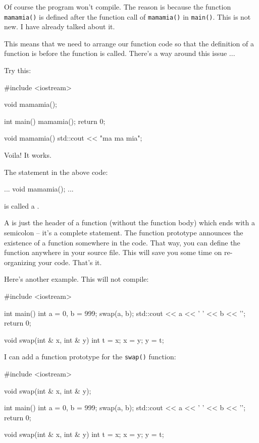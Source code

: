 Of course the program won't compile. The reason is because the function \texttt{mamamia()} is defined after the function call of \texttt{mamamia()} in \texttt{main()}. This is not new. I have already talked about it.

This means that we need to arrange our function code so that the definition of a function is before the function is called. There's a way around this issue ...

Try this:

\begin{consolethree}[escapeinside=||]
#include <iostream>

void mamamia();

int main()
{
    mamamia();
    return 0;
}

void mamamia()
{
    std::cout << "ma ma mia\n";
}
\end{consolethree}

Voila! It works.

The statement in the above code:

\begin{consolethree}[escapeinside=||]
...
void mamamia();
...
\end{consolethree}

is called a .

A  is just the header of a function (without the function body) which ends with a semicolon -- it's a complete statement. The function prototype announces the existence of a function somewhere in the code. That way, you can define the function anywhere in your source file. This will save you some time on re-organizing your code. That's it.

Here's another example. This will not compile:

\begin{consolethree}[escapeinside=||]
#include <iostream>

int main()
{
    int a = 0, b = 999;
    swap(a, b);
    std::cout << a << ' ' << b << '\n';
    return 0;
}

void swap(int & x, int & y)
{
    int t = x;
    x = y;
    y = t;
}
\end{consolethree}

I can add a function prototype for the \texttt{swap()} function:

\begin{consolethree}[escapeinside=||]
#include <iostream>

void swap(int & x, int & y);

int main()
{
    int a = 0, b = 999;
    swap(a, b);
    std::cout << a << ' ' << b << '\n';
    return 0;
}

void swap(int & x, int & y)
{
    int t = x;
    x = y;
    y = t;
}
\end{consolethree}

